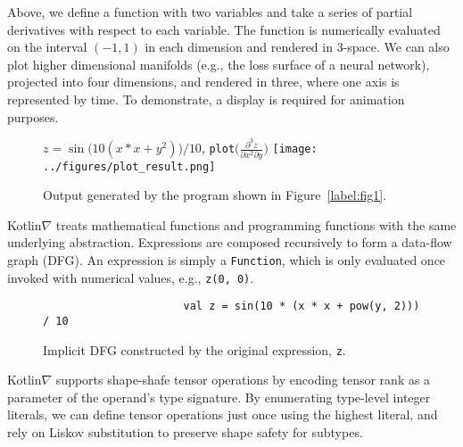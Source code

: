 \documentclass{article}
\newcommand{\squeezeup}{\vspace{-2.5mm}}
\begin{document}
    \squeezeup Above, we define a function with two variables and take a series of partial derivatives with respect to each variable. The function is numerically evaluated on the interval $(-1, 1)$ in each dimension and rendered in 3-space. We can also plot higher dimensional manifolds (e.g., the loss surface of a neural network), projected into four dimensions, and rendered in three, where one axis is represented by time. To demonstrate, a display is required for animation purposes.

    \squeezeup\begin{figure}[!htb]
                  \centering $z = \sin{\big(10(x*x + y^2)\big)} / 10$, \texttt{plot}$\Big(\frac{\partial^3z}{\partial{x^2}\partial{y}}\Big)$
                  \texttt{[image: ../figures/plot\_result.png]}
                  \squeezeup\caption{Output generated by the program shown in Figure~\ref{label:fig1}.}\squeezeup
    \end{figure}

    Kotlin$\nabla$ treats mathematical functions and programming functions with the same underlying abstraction. Expressions are composed recursively to form a data-flow graph (DFG). An expression is simply a \texttt{Function}, which is only evaluated once invoked with numerical values, e.g., \texttt{z(0, 0)}.

    \squeezeup\begin{figure}[!htb]
                  \begin{verbatim}
                      val z = sin(10 * (x * x + pow(y, 2))) / 10
                  \end{verbatim}
                  \squeezeup\centering
                  \squeezeup\squeezeup\squeezeup\caption{Implicit DFG constructed by the original expression, \texttt{z}.}
    \end{figure}

    \squeezeup Kotlin$\nabla$ supports shape-shafe tensor operations by encoding tensor rank as a parameter of the operand's type signature. By enumerating type-level integer literals, we can define tensor operations just once using the highest literal, and rely on Liskov substitution to preserve shape safety for subtypes.
\end{document}
